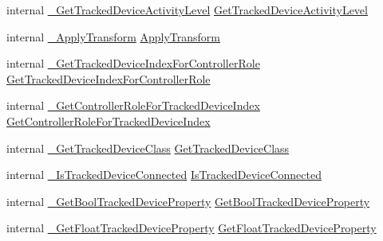 \begin{DoxyCompactItemize}
\item 
internal \mbox{\hyperlink{struct_valve_1_1_v_r_1_1_i_v_r_system_af6da0a3c81f4645a74f3ae34d3c050b6}{\+\_\+\+Get\+Tracked\+Device\+Activity\+Level}} \mbox{\hyperlink{struct_valve_1_1_v_r_1_1_i_v_r_system_acc4284c334c1b50f84803018f7efea60}{Get\+Tracked\+Device\+Activity\+Level}}
\item 
internal \mbox{\hyperlink{struct_valve_1_1_v_r_1_1_i_v_r_system_a4b3c449999bda4d5effec48e5b5d6dfa}{\+\_\+\+Apply\+Transform}} \mbox{\hyperlink{struct_valve_1_1_v_r_1_1_i_v_r_system_a7fac59520ba04459f4389fb1758280fe}{Apply\+Transform}}
\item 
internal \mbox{\hyperlink{struct_valve_1_1_v_r_1_1_i_v_r_system_a78755de15fec7aaaccc22d7539a7492a}{\+\_\+\+Get\+Tracked\+Device\+Index\+For\+Controller\+Role}} \mbox{\hyperlink{struct_valve_1_1_v_r_1_1_i_v_r_system_ae3be66c094b70af75494d85548c6747c}{Get\+Tracked\+Device\+Index\+For\+Controller\+Role}}
\item 
internal \mbox{\hyperlink{struct_valve_1_1_v_r_1_1_i_v_r_system_a38e3886f059ec9bd5728bcd5c5561e49}{\+\_\+\+Get\+Controller\+Role\+For\+Tracked\+Device\+Index}} \mbox{\hyperlink{struct_valve_1_1_v_r_1_1_i_v_r_system_ad069e02bb223054805c2feb8c4439bdd}{Get\+Controller\+Role\+For\+Tracked\+Device\+Index}}
\item 
internal \mbox{\hyperlink{struct_valve_1_1_v_r_1_1_i_v_r_system_a012f6620d3faad15d7622c5c53b091e8}{\+\_\+\+Get\+Tracked\+Device\+Class}} \mbox{\hyperlink{struct_valve_1_1_v_r_1_1_i_v_r_system_a889385c93465cef3035571bb7a89c98e}{Get\+Tracked\+Device\+Class}}
\item 
internal \mbox{\hyperlink{struct_valve_1_1_v_r_1_1_i_v_r_system_a879d599690d8f4f52620923b283b85c6}{\+\_\+\+Is\+Tracked\+Device\+Connected}} \mbox{\hyperlink{struct_valve_1_1_v_r_1_1_i_v_r_system_a73d69a5a0a052993628d025de426b5f0}{Is\+Tracked\+Device\+Connected}}
\item 
internal \mbox{\hyperlink{struct_valve_1_1_v_r_1_1_i_v_r_system_ad59f0298d859db814984c5b2c46e2a1c}{\+\_\+\+Get\+Bool\+Tracked\+Device\+Property}} \mbox{\hyperlink{struct_valve_1_1_v_r_1_1_i_v_r_system_aed27d542bd09a4f62c497e215cc9cbf8}{Get\+Bool\+Tracked\+Device\+Property}}
\item 
internal \mbox{\hyperlink{struct_valve_1_1_v_r_1_1_i_v_r_system_a463f30e32dfce512ceed667f548e83ed}{\+\_\+\+Get\+Float\+Tracked\+Device\+Property}} \mbox{\hyperlink{struct_valve_1_1_v_r_1_1_i_v_r_system_aae99b75e4e0541e865cb73d1b3a01b8e}{Get\+Float\+Tracked\+Device\+Property}}
\item 

\end{DoxyCompactItemize}
